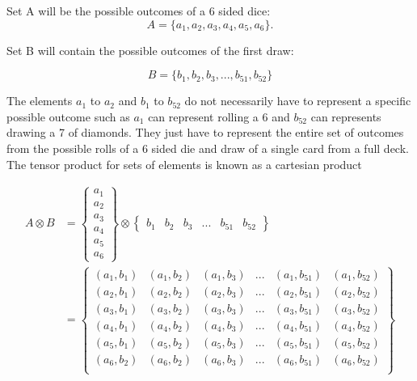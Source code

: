 \documentclass[11pt,a4paper]{book}
\begin{document}
		\noindent
		Set A will be the possible outcomes of a 6 sided dice: 
		\begin{equation}
		\label{eq:set A dice rolls}
		A = \{a_1, a_2, a_3 , a_4, a_5, a_6\}. 
		\end{equation}
		\noindent
		
		Set B will contain the possible outcomes of the first draw: 
		
		\begin{equation}
		\label{eq:set B deck of cards}
		B = \{b_1, b_2, b_3,...,b_{51},b_{52}\}
		\end{equation}
		
		\noindent		
		The elements $a_1$ to $a_2$ and $b_1$ to $b_{52}$ do not necessarily have to represent a specific possible outcome such as $a_1$ can represent rolling a 6 and $b_{52}$ can represents  drawing a 7 of diamonds. They just have to represent the entire set of outcomes from the possible rolls of a 6 sided die and draw of a single card from a full deck. The tensor product for sets of elements is known as a cartesian product
		
		\begin{equation}
			\begin{split}
				A \otimes B & =
				\begin{Bmatrix}
					a_1 \\
					a_2 \\
					a_3 \\
					a_4 \\
					a_5 \\
					a_6 
				\end{Bmatrix}
				\otimes
				\begin{Bmatrix}
					b_1 & b_2 & b_3 & ... & b_{51} & b_{52}
				\end{Bmatrix}\\
				& =
				\begin{Bmatrix}
					(a_{1},b_{1}) & (a_{1},b_{2}) & (a_{1},b_{3}) & ... & (a_{1},b_{51}) & (a_{1},b_{52}) \\
					(a_{2},b_{1}) & (a_{2},b_{2}) & (a_{2},b_{3}) & ... & (a_{2},b_{51}) & (a_{2},b_{52}) \\
					(a_{3},b_{1}) & (a_{3},b_{2}) & (a_{3},b_{3}) & ... & (a_{3},b_{51}) & (a_{3},b_{52}) \\
					(a_{4},b_{1}) & (a_{4},b_{2}) & (a_{4},b_{3}) & ... & (a_{4},b_{51}) & (a_{4},b_{52}) \\
					(a_{5},b_{1}) & (a_{5},b_{2}) & (a_{5},b_{3}) & ... & (a_{5},b_{51}) & (a_{5},b_{52}) \\
					(a_{6},b_{2}) & (a_{6},b_{2}) & (a_{6},b_{3}) & ... & (a_{6},b_{51}) & (a_{6},b_{52}) \\
				\end{Bmatrix}
			\end{split}
		\end{equation}
		
\end{document}
